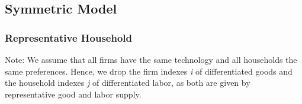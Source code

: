 \documentclass[12pt,3p,authoryear,review]{elsarticle}
\begin{document}
\pagebreak%
\subsection{Symmetric Model}%
\subsubsection{Representative Household}%
\begin{small}%
 \noindent Note: We assume that all firms have the same technology and all households the same preferences. Hence, we drop the firm indexes \textit{i} of differentiated goods and the household indexes \textit{j} of differentiated labor, as both are given by representative good and labor supply.

\end{small}
\end{document}
